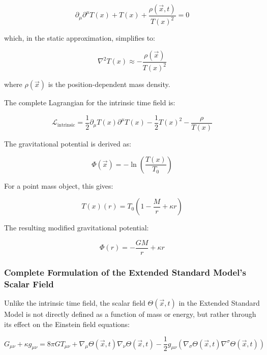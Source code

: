 \documentclass[12pt,a4paper]{article}
\newcommand{\Tfield}{T(x)}
\newcommand{\Tzero}{T_0}
\newcommand{\vecx}{\vec{x}}
\begin{document}
	\begin{equation}
		\partial_{\mu}\partial^{\mu}\Tfield + \Tfield + \frac{\rho(\vecx,t)}{\Tfield^2} = 0
	\end{equation}
	
	which, in the static approximation, simplifies to:
	
	\begin{equation}
		\nabla^2 \Tfield \approx -\frac{\rho(\vecx)}{\Tfield^2}
	\end{equation}
	
	where \(\rho(\vecx)\) is the position-dependent mass density.
	
	The complete Lagrangian for the intrinsic time field is:
	
	\begin{equation}
		\mathcal{L}_{\text{intrinsic}} = \frac{1}{2}\partial_{\mu}\Tfield\partial^{\mu}\Tfield - \frac{1}{2}\Tfield^2 - \frac{\rho}{\Tfield}
	\end{equation}
	
	The gravitational potential is derived as:
	
	\begin{equation}
		\Phi(\vecx) = -\ln\left(\frac{\Tfield}{\Tzero}\right)
	\end{equation}
	
	For a point mass object, this gives:
	
	\begin{equation}
		\Tfield(r) = \Tzero\left(1 - \frac{M}{r} + \kappa r\right)
	\end{equation}
	
	The resulting modified gravitational potential:
	
	\begin{equation}
		\Phi(r) = -\frac{GM}{r} + \kappa r
	\end{equation}
	
	\subsubsection{Complete Formulation of the Extended Standard Model's Scalar Field}
	\label{subsubsec:esm_complete}
	
	Unlike the intrinsic time field, the scalar field \(\Theta(\vecx,t)\) in the Extended Standard Model is not directly defined as a function of mass or energy, but rather through its effect on the Einstein field equations:
	
	\begin{equation}
		G_{\mu\nu} + \kappa g_{\mu\nu} = 8\pi G T_{\mu\nu} + \nabla_{\mu}\Theta(\vecx,t)\nabla_{\nu}\Theta(\vecx,t) - \frac{1}{2}g_{\mu\nu}(\nabla_{\sigma}\Theta(\vecx,t)\nabla^{\sigma}\Theta(\vecx,t))
	\end{equation}
	
\end{document}
